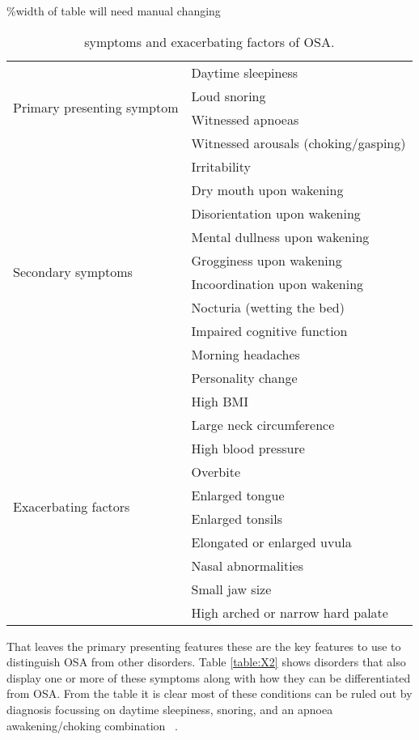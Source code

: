 \begin{table}[h]
\%width of table will need manual changing
\centering
\begin{tabular}{l l}
\toprule
\multirow{4}{*}{Primary presenting symptom}&Daytime sleepiness\\ 
&Loud snoring\\ 
&Witnessed apnoeas\\ 
&Witnessed arousals (choking/gasping)\\ 
\multirow{10}{*}{Secondary symptoms}&Irritability\\ 
&Dry mouth upon wakening\\ 
&Disorientation upon wakening\\ 
&Mental dullness upon wakening\\ 
&Grogginess upon wakening\\ 
&Incoordination upon wakening\\ 
&Nocturia (wetting the bed)\\ 
&Impaired cognitive function\\ 
&Morning headaches\\ 
&Personality change\\ 
\multirow{10}{*}{Exacerbating factors}&High BMI\\ 
&Large neck circumference\\ 
&High blood pressure\\ 
&Overbite\\ 
&Enlarged tongue\\ 
&Enlarged tonsils\\ 
&Elongated or enlarged uvula\\ 
&Nasal abnormalities\\ 
&Small jaw size\\ 
&High arched or narrow hard palate\\ \bottomrule
\end{tabular}
\caption{symptoms and exacerbating factors of OSA.}
\label{table:X4}
\end{table}

That leaves the primary presenting features these are the key features to use to distinguish OSA from other disorders. Table \ref{table:X2} shows disorders that also display one or more of these symptoms along with how they can be differentiated from OSA. From the table it is clear most of these conditions can be ruled out by diagnosis focussing on daytime sleepiness, snoring, and an apnoea awakening/choking combination ~\cite{american2001international}.

